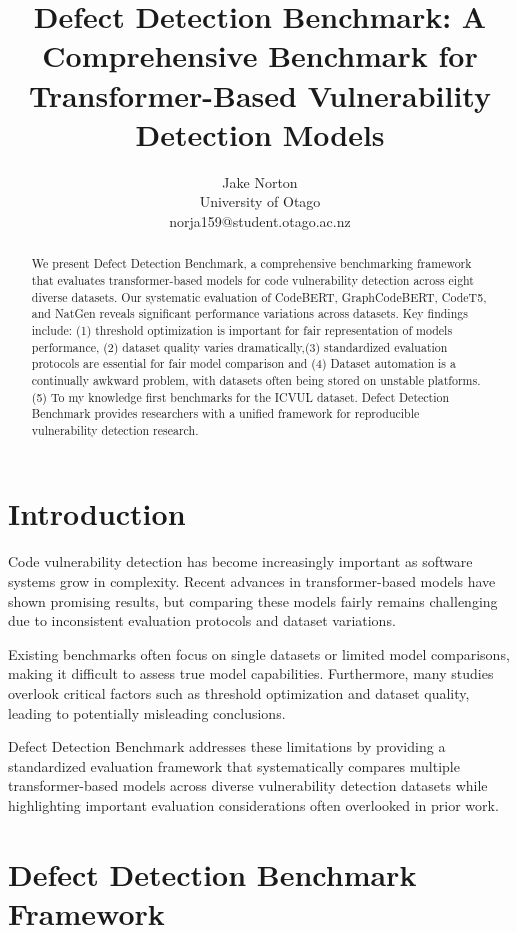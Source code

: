 \documentclass[letterpaper]{article}
\title{Defect Detection Benchmark: A Comprehensive Benchmark for Transformer-Based Vulnerability Detection Models}
\author{
Jake Norton\\
University of Otago\\
norja159@student.otago.ac.nz
}
\begin{document}
\maketitle

\begin{abstract}
	We present Defect Detection Benchmark, a comprehensive benchmarking framework that evaluates transformer-based models for code vulnerability detection across eight diverse datasets. Our systematic evaluation of CodeBERT, GraphCodeBERT, CodeT5, and NatGen reveals significant performance variations across datasets. Key findings include: (1) threshold optimization is important for fair representation of models performance, (2) dataset quality varies dramatically,(3) standardized evaluation protocols are essential for fair model comparison and (4) Dataset automation is a continually awkward problem, with datasets often being stored on unstable platforms.(5) To my knowledge first benchmarks for the ICVUL dataset. Defect Detection Benchmark provides researchers with a unified framework for reproducible vulnerability detection research.
\end{abstract}

\section{Introduction}

Code vulnerability detection has become increasingly important as software systems grow in complexity. Recent advances in transformer-based models have shown promising results, but comparing these models fairly remains challenging due to inconsistent evaluation protocols and dataset variations.

Existing benchmarks often focus on single datasets or limited model comparisons, making it difficult to assess true model capabilities. Furthermore, many studies overlook critical factors such as threshold optimization and dataset quality, leading to potentially misleading conclusions.

Defect Detection Benchmark addresses these limitations by providing a standardized evaluation framework that systematically compares multiple transformer-based models across diverse vulnerability detection datasets while highlighting important evaluation considerations often overlooked in prior work.

\section{Defect Detection Benchmark Framework}
\end{document}
